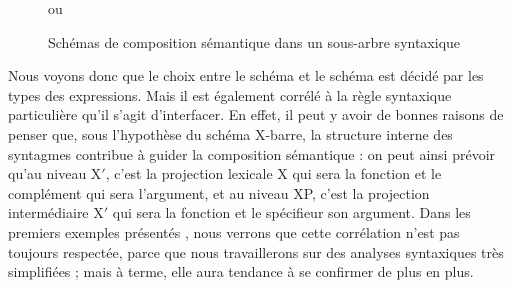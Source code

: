 \begin{figure}[h]
\begin{center} 
{\large
{}  
}
\qquad\qquad
ou
\qquad
{\large
{}  
}
\caption{Schémas de composition sémantique dans un sous-arbre syntaxique}\label{f:schemcompsem2}
\end{center}
\end{figure}


Nous voyons donc que le choix entre le schéma \Last[a] et le schéma \Last[b] est décidé par les types des expressions. 
Mais il est également corrélé à la règle syntaxique particulière qu'il s'agit d'interfacer. 
En effet, il peut y avoir de bonnes raisons de penser que, sous l'hypothèse du schéma X-barre, la structure interne des syntagmes contribue à guider la composition sémantique : on peut ainsi prévoir qu'au niveau X$'$, c'est la projection lexicale X qui sera la fonction et le complément qui sera l'argument, et au niveau XP, c'est la projection intermédiaire X$'$ qui sera la fonction et le spécifieur son argument.  Dans les premiers exemples présentés , nous verrons que cette corrélation n'est pas toujours respectée, parce que nous travaillerons sur des analyses syntaxiques très simplifiées ; mais à terme, elle aura tendance à se confirmer de plus en plus. 



